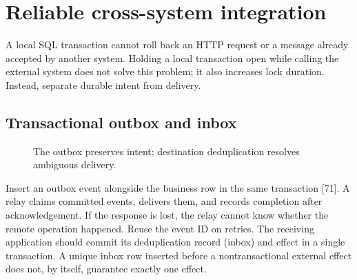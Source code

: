 \chapter{Reliable cross-system integration}
\label{ch:enterprise-outbox}



A local SQL transaction cannot roll back an HTTP request or a message
already accepted by another system. Holding a local transaction open while
calling the external system does not solve this problem; it also increases
lock duration. Instead, separate durable intent from delivery.


\section{Transactional outbox and inbox}
\begin{figure}[!htbp]\centering
{}
\caption{The outbox preserves intent; destination deduplication resolves ambiguous delivery.}
\end{figure}
Insert an outbox event alongside the business row in the same transaction
[71]. A relay claims committed events, delivers them, and records completion
after acknowledgement. If the response is lost, the relay cannot know
whether the remote operation happened. Reuse the event ID on retries.
The receiving application should commit its deduplication record (inbox)
and effect in a single transaction. A unique inbox row inserted before a
nontransactional external effect does not, by itself, guarantee exactly
one effect.

